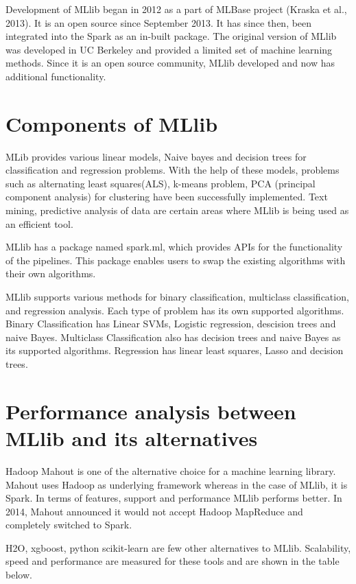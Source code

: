 \documentclass[9pt,twocolumn,twoside]{../../styles/osajnl}
\begin{document}
Development of MLlib began in 2012 as a part of MLBase project (Kraska
et al., 2013). It is an open source since September 2013. It has since
then, been integrated into the Spark as an in-built package. The
original version of MLlib was developed in UC Berkeley and provided a
limited set of machine learning methods. Since it is an open source
community, MLlib developed and now has additional functionality.
 

\section{Components of MLlib}

MLib provides various linear models, Naive bayes and decision trees
for classification and regression problems. With the help of these
models, problems such as alternating least squares(ALS), k-means
problem, PCA (principal component analysis) for clustering have been
successfully implemented. Text mining, predictive analysis of data are
certain areas where MLlib is being used as an efficient tool.

MLlib has a package named spark.ml, which provides APIs for the
functionality of the pipelines. This package enables users to swap the
existing algorithms with their own algorithms.\cite{MLlib-article}

MLlib supports various methods for binary classification, multiclass
classification, and regression analysis. Each type of problem has its
own supported algorithms. Binary Classification has Linear SVMs,
Logistic regression, descision trees and naive Bayes. Multiclass
Classification also has decision trees and naive Bayes as its
supported algorithms. Regression has linear least squares, Lasso and
decision trees.

\section{Performance analysis between MLlib and its alternatives}
Hadoop Mahout is one of the alternative choice for a machine learning
library. Mahout uses Hadoop as underlying framework whereas in the
case of MLlib, it is Spark. In terms of features, support and
performance MLlib performs better. In 2014, Mahout announced it would
not accept Hadoop MapReduce and completely switched to Spark.

H2O, xgboost, python scikit-learn are few other alternatives to
MLlib. Scalability, speed and performance are measured for these tools
and are shown in the table below.
\end{document}
